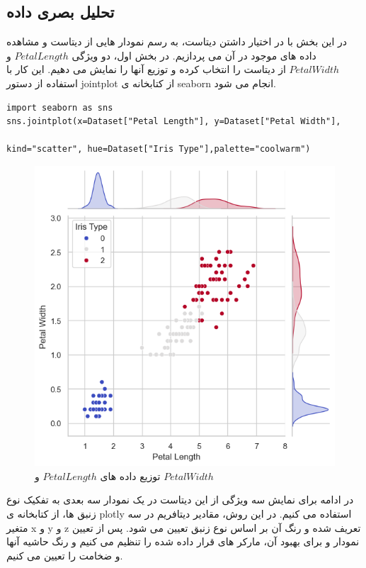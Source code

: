 \subsection{تحلیل بصری داده}
در این بخش با در اختیار داشتن دیتاست، به رسم نمودار هایی از دیتاست و مشاهده داده های موجود در آن می پردازیم.
در بخش اول، دو ویژگی $Petal Length$ و $Petal Width$ از دیتاست را انتخاب کرده و توزیع آنها را نمایش می دهیم. این کار با استفاده از دستور jointplot از کتابخانه ی seaborn انجام می شود.
\begin{verbatim}
import seaborn as sns
sns.jointplot(x=Dataset["Petal Length"], y=Dataset["Petal Width"],

kind="scatter", hue=Dataset["Iris Type"],palette="coolwarm")
\end{verbatim}
\begin{figure}[H]
	\centering
	\includegraphics[width=1\linewidth]{../img/9}
	\caption{توزیع داده های $Petal Length$ و $Petal Width$ }
	\label{fig:9}
\end{figure}
در ادامه برای نمایش سه ویژگی از این دیتاست در یک نمودار سه بعدی به تفکیک نوع زنبق ها، از کتابخانه ی plotly استفاده می کنیم. در این روش، مقادیر دیتافریم در سه متغیر x و y و z تعریف شده و رنگ آن بر اساس نوع زنبق تعیین می شود.
پس از تعیین نمودار و برای بهبود آن، مارکر های قرار داده شده را تنظیم می کنیم و رنگ حاشیه آنها و ضخامت را تعیین می کنیم.
